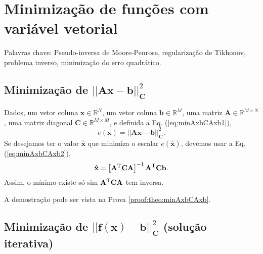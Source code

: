 
\chapter{Minimização de funções com variável vetorial}

\begin{remark}
Palavras chave: 
Pseudo-inversa de Moore-Penrose,
regularização de Tikhonov,
problema inverso, 
minimização do erro quadrático. 
\end{remark}
\section{Minimização de $||\mathbf{A}\mathbf{x}-\mathbf{b}||_{\mathbf{C}}^2$
}

\begin{theorem}\label{theo:minAxbCAxb}
Dados,
um vetor coluna $\mathbf{x}\in \mathbb{R}^N$, 
um vetor coluna $\mathbf{b}\in \mathbb{R}^M$,  
uma matriz $\mathbf{A} \in \mathbb{R}^{M\times N}$, 
uma matriz diagonal $\mathbf{C} \in \mathbb{R}^{M\times M}$, e 
definida a Eq. (\ref{eq:minAxbCAxb1}),
\begin{equation}\label{eq:minAxbCAxb1}
e(\mathbf{x})=||\mathbf{A}\mathbf{x}-\mathbf{b}||_{\mathbf{C}}^2.
\end{equation}
Se desejamos ter o valor $\mathbf{\hat{x}}$ que minimiza o escalar $e(\mathbf{\hat{x}})$,
devemos usar a Eq. (\ref{eq:minAxbCAxb2}),
\begin{equation}\label{eq:minAxbCAxb2}
\mathbf{\hat{x}} =
\left[ \mathbf{A}^{\mathrm{T}}\mathbf{C} \mathbf{A} \right]^{-1}\mathbf{A}^{\mathrm{T}}\mathbf{C}\mathbf{b}.
\end{equation}
Assim, o mínimo existe só sim $\mathbf{A}^{\mathrm{T}}\mathbf{C} \mathbf{A}$ tem inversa.

A demostração pode ser vista na Prova \ref{proof:theo:minAxbCAxb}.
\end{theorem}



\section{Minimização de $||\mathbf{f}(\mathbf{x})-\mathbf{b}||_{\mathbf{C}}^2$
(solução iterativa)
}

